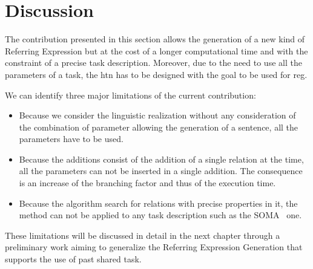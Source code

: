 \section{Discussion}

The contribution presented in this section allows the generation of a new kind of Referring Expression but at the cost of a longer computational time and with the constraint of a precise task description. Moreover, due to the need to use all the parameters of a task, the \acrshort{htn} has to be designed with the goal to be used for \acrshort{reg}.

We can identify three major limitations of the current contribution:
\begin{itemize}
  \item Because we consider the linguistic realization without any consideration of the combination of parameter allowing the generation of a sentence, all the parameters have to be used.
  \item Because the additions consist of the addition of a single relation at the time, all the parameters can not be inserted in a single addition. The consequence is an increase of the branching factor and thus of the execution time.
  \item Because the algorithm search for relations with precise properties in it, the method can not be applied to any task description such as the SOMA~\cite{bessler_2020_foundations} one.
\end{itemize}

These limitations will be discussed in detail in the next chapter through a preliminary work aiming to generalize the Referring Expression Generation that supports the use of past shared task.